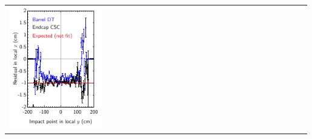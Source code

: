 \documentclass[compress]{beamer}
\begin{document}
\begin{frame}
\begin{center}
\begin{tabular}{p{0.33\linewidth} p{0.33\linewidth} p{0.33\linewidth}}
\begin{minipage}{\linewidth}
	\includegraphics[width=\linewidth]{x_xresid_vs_y}
      \end{minipage} &
      \begin{minipage}{\linewidth}
	\hspace{-1.4 cm}

\end{minipage}
\end{tabular}
\end{center}
\end{frame}
\end{document}
